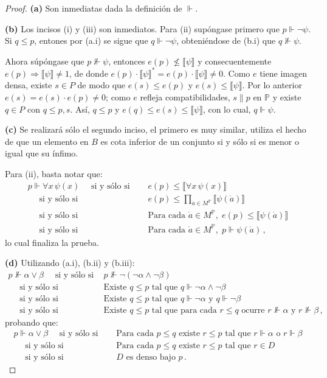 \documentclass[letterpaper,DIV=15,12pt]{scrartcl}
\newcommand{\sii}{\quad \text{ si y sólo si } \quad}
\newcommand{\Bv}[1]{\llbracket #1 \rrbracket}
\begin{document}
    \begin{proof}
        \textbf{(a)} Son inmediatas dada la definición de $\Vdash$.

        \textbf{(b)} Los incisos (i) y (iii) son inmediatos. Para (ii) supóngase primero que $p \Vdash \lnot \psi$. Si $q \leq p$, entones por (a.i) se sigue que $q \Vdash \lnot \psi$, obteniéndose de (b.i) que $q \not\Vdash \psi$.

        Ahora súpóngase que $p \not\Vdash \psi$, entonces $e(p) \not\leq \Bv{\psi}$ y consecuentemente $e(p) \Rightarrow \Bv{\psi} \neq 1$, de donde $e(p) \cdot \Bv{\psi}^* = e(p) \cdot \Bv{\psi} \neq 0$. Como $e$ tiene imagen densa, existe $s \in P$ de modo que $e(s) \leq e(p)$ y $e(s) \leq \Bv{\psi}$. Por lo anterior $e(s) = e(s) \cdot e(p) \neq 0$; como $e$ refleja compatibilidades, $s \parallel p$ en $\mathbb{P}$ y existe $q \in P$ con $q \leq p,s$. Así, $q \leq p$ y $e(q)\leq e(s) \leq \Bv{\psi}$, con lo cual, $q \Vdash \psi$.

        \textbf{(c)} Se realizará sólo el segundo inciso, el primero es muy similar, utiliza el hecho de que un elemento en $B$ es cota inferior de un conjunto si y sólo si es menor o igual que su ínfimo.

        Para (ii), basta notar que:
        \begin{align*}
            p \Vdash \forall x \, \psi(x) \sii & e(p) \leq \Bv{\forall x \, \psi(x)} \\
            \sii & e(p) \leq \prod_{\dot{a} \in M^{\mathbb{P}}} \Bv{\psi(\dot{a})} \\
            \sii & \text{Para cada } \dot{a}\in M^{\mathbb{P}}, \; e(p) \leq \Bv{\psi(\dot{a})} \\
            \sii & \text{Para cada } \dot{a}\in M^{\mathbb{P}}, \; p \Vdash \psi(\dot{a}) \, ,
        \end{align*}
        lo cual finaliza la prueba.

        \textbf{(d)} Utilizando (a.i), (b.ii) y (b.iii):
        \begin{align*}
            p \not\Vdash \alpha \lor \beta \sii & p \not\Vdash \lnot (\lnot \alpha \land \lnot \beta) \\
            \sii & \text{Existe } q \leq p \text{ tal que } q \Vdash \lnot \alpha \land \lnot \beta \\
            \sii & \text{Existe } q \leq p \text{ tal que } q \Vdash \lnot \alpha \text{ y } q \Vdash \lnot \beta \\
            \sii & \text{Existe } q \leq p \text{ tal que para cada } r \leq q \text{ ocurre } r \not\Vdash \alpha \text{ y } r \not\Vdash \beta \, ,
        \end{align*}
        probando que:
        \begin{align*}
            p \Vdash \alpha \lor \beta \sii & \text{Para cada } p \leq q \text{ existe } r \leq p \text{ tal que } r \Vdash \alpha \text{ o } r \Vdash \beta \\
            \sii & \text{Para cada } p \leq q \text{ existe } r \leq p \text{ tal que } r \in D \\
            \sii & D \text{ es denso bajo } p \, .
        \end{align*}


\end{proof}
\end{document}
